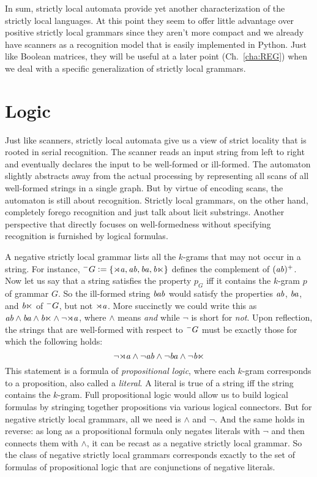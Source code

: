 In sum, strictly local automata provide yet another characterization of the strictly local languages.
At this point they seem to offer little advantage over positive strictly local grammars since they aren't more compact and we already have scanners as a recognition model that is easily implemented in Python.
Just like Boolean matrices, they will be useful at a later point (Ch.~\ref{cha:REG}) when we deal with a specific generalization of strictly local grammars.



\section{Logic}

Just like scanners, strictly local automata give us a view of strict locality that is rooted in serial recognition.
The scanner reads an input string from left to right and eventually declares the input to be well-formed or ill-formed.
The automaton slightly abstracts away from the actual processing by representing all scans of all well-formed strings in a single graph.
But by virtue of encoding scans, the automaton is still about recognition.
Strictly local grammars, on the other hand, completely forego recognition and just talk about licit substrings.
Another perspective that directly focuses on well-formedness without specifying recognition is furnished by logical formulas.

A negative strictly local grammar lists all the $k$-grams that may not occur in a string.
For instance, $^- G \mathrel{\mathop:}= \left \{ \mathit{\rtimes a}, \mathit{ab}, \mathit{ba}, \mathit{b \ltimes} \right \}$ defines the complement of $(\mathit{ab})^+$.
Now let us say that a string satisfies the property $p_G$ iff it contains the $k$-gram $p$ of grammar $G$.
So the ill-formed string $\mathit{bab}$ would satisfy the properties $\mathit{ab}$, $\mathit{ba}$, and $\mathit{b \ltimes}$ of $^- G$, but not $\mathit{\rtimes a}$.
More succinctly we could write this as $\mathit{ab} \wedge \mathit{ba} \wedge \mathit{b \ltimes} \wedge \neg \mathit{\rtimes a}$, where $\wedge$ means \emph{and} while $\neg$ is short for \emph{not}.
Upon reflection, the strings that are well-formed with respect to $^- G$ must be exactly those for which the following holds:
%
\[
    \neg \mathit{\rtimes a}
    \wedge
    \neg \mathit{ab}
    \wedge
    \neg \mathit{ba}
    \wedge
    \neg \mathit{b\ltimes}
\]
%
This statement is a formula of \emph{propositional logic}, where each $k$-gram corresponds to a proposition, also called a \emph{literal}.
A literal is true of a string iff the string contains the $k$-gram.
Full propositional logic would allow us to build logical formulas by stringing together propositions via various logical connectors.
But for negative strictly local grammars, all we need is $\wedge$ and $\neg$.
And the same holds in reverse: as long as a propositional formula only negates literals with $\neg$ and then connects them with $\wedge$, it can be recast as a negative strictly local grammar.
So the class of negative strictly local grammars corresponds exactly to the set of formulas of propositional logic that are conjunctions of negative literals.

